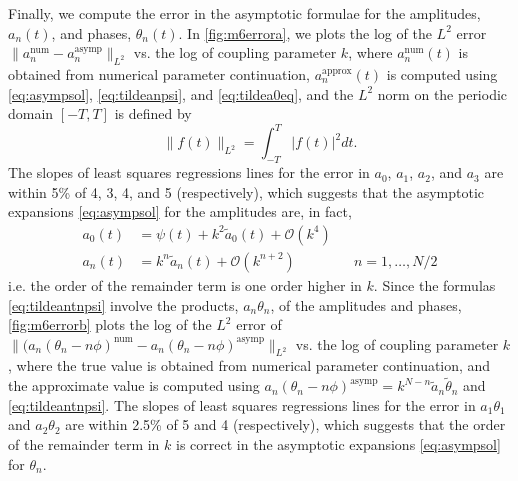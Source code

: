 \documentclass[11pt,reqno]{amsart}
\begin{document}
Finally, we compute the error in the asymptotic formulae for the amplitudes, $a_n(t)$, and phases, $\theta_n(t)$. In \cref{fig:m6errora}, we plots the log of the $L^2$ error $\| a_n^{\text{num}} - a_n^{\text{asymp}} \|_{L^2}$ vs. the log of coupling parameter $k$, where $a_n^{\text{num}}(t)$ is obtained from numerical parameter continuation, $a_n^{\text{approx}}(t)$ is computed using \cref{eq:asympsol}, \cref{eq:tildeanpsi}, and \cref{eq:tildea0eq}, and the $L^2$ norm on the periodic domain $[-T,T]$ is defined by
\[
\| f(t) \|_{L^2} = \int_{-T}^T |f(t)|^2 dt.
\] 
The slopes of least squares regressions lines for the error in $a_0$, $a_1$, $a_2$, and $a_3$ are within 5\% of 4, 3, 4, and 5 (respectively), which suggests that the asymptotic expansions \cref{eq:asympsol} for the amplitudes are, in fact, 
\begin{equation}\label{eq:asympsol2}
\begin{aligned}
a_0(t) &= \psi(t) + k^2 \widetilde{a}_0(t) + \mathcal{O}(k^4) \\
a_n(t) &= k^n \widetilde{a}_n(t) + \mathcal{O}(k^{n+2}) && n = 1, \dots, N/2
\end{aligned}
\end{equation}
i.e. the order of the remainder term is one order higher in $k$. Since the formulas \cref{eq:tildeantnpsi} involve the products, $a_n \theta_n$, of the amplitudes and phases, \cref{fig:m6errorb} plots the log of the $L^2$ error of $\| (a_n (\theta_n - n \phi)^{\text{num}} - a_n(\theta_n - n \phi)^{\text{asymp}}\|_{L^2}$ vs. the log of coupling parameter $k$, where the true value is obtained from numerical parameter continuation, and the approximate value is computed using 
$a_n (\theta_n - n \phi )^{\text{asymp}} = k^{N-n} \widetilde{a}_n \widetilde{\theta}_n$ and \cref{eq:tildeantnpsi}. The slopes of least squares regressions lines for the error in $a_1\theta_1$ and $a_2\theta_2$ are within 2.5\% of 5 and 4 (respectively), which suggests that the order of the remainder term in $k$ is correct in the asymptotic expansions \cref{eq:asympsol} for $\theta_n$.
\end{document}
